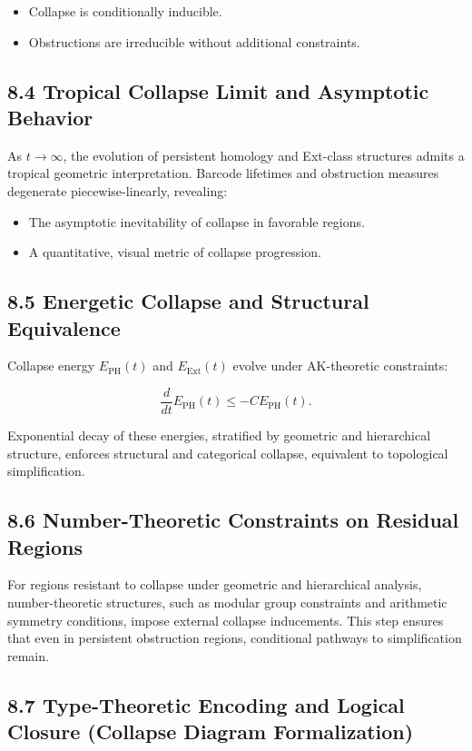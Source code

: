\documentclass[11pt]{article}
\begin{document}
\begin{itemize}
    \item Collapse is conditionally inducible.
    \item Obstructions are irreducible without additional constraints.
\end{itemize}

\subsection{8.4 Tropical Collapse Limit and Asymptotic Behavior}

As $t \to \infty$, the evolution of persistent homology and Ext-class structures admits a tropical geometric interpretation. Barcode lifetimes and obstruction measures degenerate piecewise-linearly, revealing:

\begin{itemize}
    \item The asymptotic inevitability of collapse in favorable regions.
    \item A quantitative, visual metric of collapse progression.
\end{itemize}

\subsection{8.5 Energetic Collapse and Structural Equivalence}

Collapse energy $E_{\mathrm{PH}}(t)$ and $E_{\mathrm{Ext}}(t)$ evolve under AK-theoretic constraints:

\[\frac{d}{dt} E_{\mathrm{PH}}(t) \leq -C E_{\mathrm{PH}}(t).\]

Exponential decay of these energies, stratified by geometric and hierarchical structure, enforces structural and categorical collapse, equivalent to topological simplification.

\subsection{8.6 Number-Theoretic Constraints on Residual Regions}

For regions resistant to collapse under geometric and hierarchical analysis, number-theoretic structures, such as modular group constraints and arithmetic symmetry conditions, impose external collapse inducements. This step ensures that even in persistent obstruction regions, conditional pathways to simplification remain.

\subsection{8.7 Type-Theoretic Encoding and Logical Closure (Collapse Diagram Formalization)}
\end{document}
